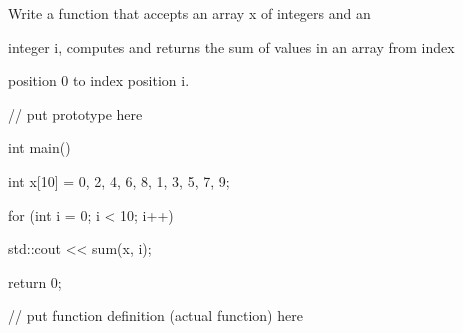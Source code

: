 Write a function that accepts an array x of integers and an

integer i, computes and returns the sum of values in an array from index

position 0 to index position i.

\begin{consolethree}[escapeinside=||]

// put prototype here



int main()

{

    int x[10] = {0, 2, 4, 6, 8, 1, 3, 5, 7, 9};

    for (int i = 0; i < 10; i++)

    {

        std::cout << sum(x, i);

    }

    return 0;

}



// put function definition (actual function) here

\end{consolethree}


